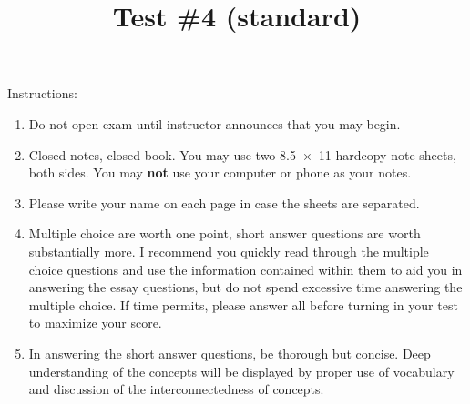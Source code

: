 \documentclass[exam,addpoints,noanswers]{exam}
\title{Test \#4 (standard)}
\date{\printdate{6/1/2021}}
\author{\mobeardInstructorShort}
\begin{document}
\maketitle
\vfill
\mobeardExamNameBlock
\vfill
Instructions: 
\begin{enumerate}
\item Do not open exam until instructor announces that you may begin.
\item Closed notes, closed book.  You may use two \SI{8.5x11}{\inch} hardcopy note sheets, both sides. You may \textbf{not} use your computer or phone as your notes. 
\item Please write your name on each page in case the sheets are separated. 
\item Multiple choice are worth one point, short answer questions are worth substantially more. I recommend you quickly read through the multiple choice questions and use the information contained within them to aid you in answering the essay questions, but do not spend excessive time answering the multiple choice. If time permits, please answer all before turning in your test to maximize your score.
\item In answering the short answer questions, be thorough but concise. Deep understanding of the concepts will be displayed by proper use of vocabulary and discussion of the interconnectedness of concepts.
\end{enumerate}
\vfill
\begin{center}
\gradetable[h][questions]
\end{center}
\clearpage
\end{document}
